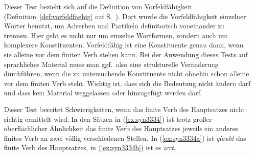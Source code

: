 Dieser Test bezieht sich auf die Definition von Vorfeldfähigkeit (Definition~\ref{def:vorfeldfaehig} auf S.~\pageref{def:vorfeldfaehig}).
Dort wurde die Vorfeldfähigkeit einzelner Wörter benutzt, um Adverben und Partikeln definitorisch voneinander zu trennen.
Hier geht es nicht nur um einzelne Wortformen, sondern auch um komplexere Konstituenten.
Vorfeldfähig ist eine Konstituente genau dann, wenn sie alleine vor dem finiten Verb stehen kann.
Bei der Anwendung dieses Tests auf sprachliches Material muss man ggf.\ also eine strukturelle Veränderung durchführen, wenn die zu untersuchende Konstituente nicht ohnehin schon alleine vor dem finiten Verb steht.
Wichtig ist, dass sich die Bedeutung nicht ändern darf und dass kein Material weggelassen oder hinzugefügt werden darf.

\begin{exe}
  \ex\label{ex:syn3333}
  \begin{xlist}
  \end{xlist}
\end{exe}

Dieser Test bereitet Schwierigkeiten, wenn das finite Verb des Hauptsatzes nicht richtig ermittelt wird.
In den Sätzen in (\ref{ex:syn3334}) ist trotz großer oberflächlicher Ähnlichkeit das finite Verb des Hauptsatzes jeweils ein anderes finites Verb an zwei völlig verschiedenen Stellen.
In (\ref{ex:syn3334a}) ist \textit{glaubt} das finite Verb des Hauptsatzes, in (\ref{ex:syn3334b}) ist es \textit{irrt}.

\begin{exe}
  \ex\label{ex:syn3334}
  \begin{xlist}
  \end{xlist}
\end{exe}

